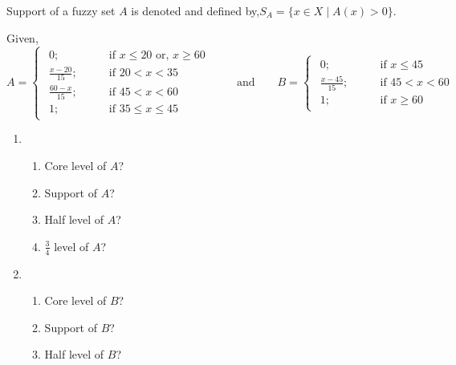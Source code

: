 \documentclass[../main-sheet.tex]{subfiles}
\begin{document}
\begin{defn}
    Support of a fuzzy set \(A\) is denoted and defined by,\(S_A=\{x\in X\mid A(x)>0\}\).
\end{defn}
\begin{ex}
    Given,
    \[
        A=\begin{cases}
            \begin{aligned}
                0; \qquad&\text{if } x\leq20 \text{ or, }x\geq 60\\
                \frac{x-20}{15}; \qquad&\text{if }20< x<35\\
                \frac{60-x}{15}; \qquad&\text{if }45< x<60\\
                1; \qquad&\text{if }35\leq x\leq 45
            \end{aligned}
    \end{cases}
    \qquad\text{and}\qquad
    B=\begin{cases}
        \begin{aligned}
            0; \qquad&\text{if }x\leq45\\
            \frac{x-45}{15}; \qquad&\text{if }45< x<60\\
            1; \qquad&\text{if }x\geq 60
        \end{aligned}
    \end{cases}
    \]
    \begin{enumerate}
        \item \begin{enumerate}
            \item Core level of \(A \)?
            \item Support of \(A \)?
            \item Half level of \(A \)?
            \item \(\frac{3}{4}\) level of \(A \)?
        \end{enumerate}
        \item \begin{enumerate}
            \item Core level of \(B \)?
            \item Support of \(B \)?
            \item Half level of \(B \)?
        \end{enumerate}
    \end{enumerate}
\end{ex}
\end{document}
